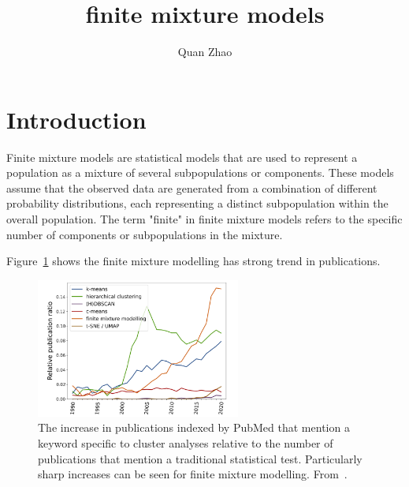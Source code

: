 \documentclass{article}
\begin{document}
\title{finite mixture models}

\author{Quan Zhao}

\maketitle



\section{Introduction}

Finite mixture models are statistical models that are used to represent a population as a mixture of several subpopulations or components. These models assume that the observed data are generated from a combination of different probability distributions, each representing a distinct subpopulation within the overall population. The term "finite" in finite mixture models refers to the specific number of components or subpopulations in the mixture.

Figure~\ref{fig:trend} shows the finite mixture modelling has strong trend in publications.

\begin{figure}[h!] %
    \centering %
    \includegraphics[width=0.6\textwidth]{images/trend.png} %
    \caption{The increase in publications indexed by PubMed that mention a keyword specific to cluster analyses relative to the number of publications 
    that mention a traditional statistical test. 
    Particularly sharp increases can be seen for finite mixture modelling.
    From~\cite{dalmaijer2022statistical}.} %
    \label{fig:trend} %
  \end{figure}
\end{document}

